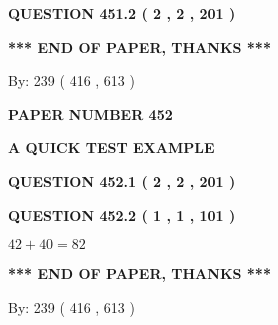 \documentclass[12pt]{article}
\begin{document}
{\textbf{\Large{QUESTION
451.2 
 ( 2 , 2 , 201 )
}}}
  
  
   
   
 \vspace{0.2in}
 
   
   
   
   
\vspace{1.0in} 
{\textbf{\large{ *** END OF PAPER, THANKS *** }}} 
   
   
\hspace{1.0in} By: 
 239 ( 416 ,  613 )
   
   
   
   
\newpage 
\setcounter{page}{ 
   452001 } 
   
   
   
   
 {\textbf{ \Large{ PAPER NUMBER  452  }}}
   
   
\vspace{0.2in}
   
   
   
   
   
   
 \vspace{0.2in}
{\LARGE {\textbf{ A QUICK TEST EXAMPLE}}}
   
   
  
\vspace{0.2in}
  
{\textbf{\Large{QUESTION
452.1 
 ( 2 , 2 , 201 )
}}}
  
  
  
\vspace{0.2in}
  
{\textbf{\Large{QUESTION
452.2 
 ( 1 , 1 , 101 )
}}}
  
  
 
 

$ %
42 +  %
40=   %
82$
 
 
   
   
 \vspace{0.2in}
 
   
   
   
   
\vspace{1.0in} 
{\textbf{\large{ *** END OF PAPER, THANKS *** }}} 
   
   
\hspace{1.0in} By: 
 239 ( 416 ,  613 )
   
   
   
   
\newpage 
\setcounter{page}{ 
   453001 } 
   
\end{document}
